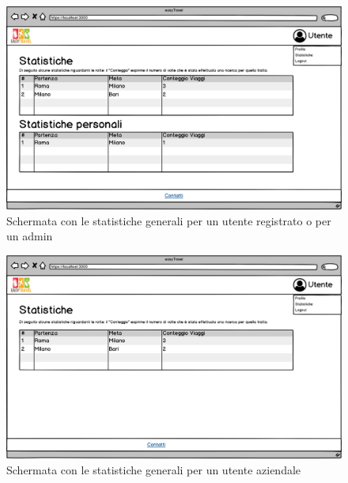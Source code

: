 \documentclass[11pt]{article}
\begin{document}
\begin{figure}[!ht]
	\includegraphics[width=1\textwidth]{./Mockup/Statistiche-user-admin} %
	\caption{Schermata con le statistiche generali per un utente registrato o per un admin}
	\label{fig:statisticheuseradmin}
\end{figure}

\begin{figure}[!ht]
	\includegraphics[width=1\textwidth]{./Mockup/Statistiche-aziendale} %
	\caption{Schermata con le statistiche generali per un utente aziendale}
	\label{fig:statisticheaziendale}
\end{figure}
\end{document}
